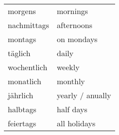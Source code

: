 \documentclass[a4paper,12pt]{article}
\begin{document}
\begin{adjustwidth}{2em}{0pt}
\begin{minipage}{0.45\textwidth}
\begin{tabular}{l|l}
\rowcolor{white}      morgens     & mornings \\
\rowcolor{lightgray}  nachmittags & afternoons  \\
\rowcolor{white}      montags     & on mondays \\
\rowcolor{lightgray}  täglich     & daily \\
\rowcolor{white}      wochentlich & weekly \\
\rowcolor{lightgray}  monatlich   & monthly \\
\rowcolor{white}      jährlich    & yearly / anually \\
\rowcolor{lightgray}  halbtags    & half days \\
\rowcolor{white}      feiertags   & all holidays  \\

\bottomrule
\end{tabular}
\vspace{0.3cm}
\newline
\end{minipage}

\end{adjustwidth}

\end{document}
